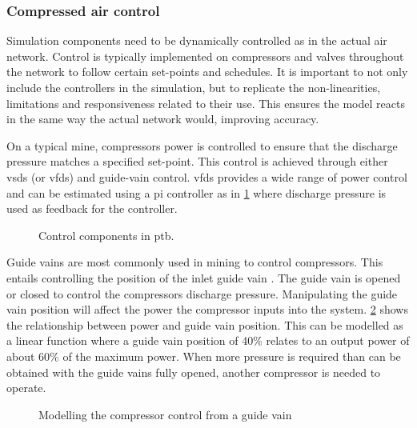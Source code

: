 		\subsubsection{Compressed air control}\label{Controllers}
			Simulation components need to be dynamically controlled as in the actual air network. Control is typically implemented on compressors and valves throughout the network to follow certain set-points and schedules. It is important to not only include the controllers in the simulation, but to replicate the non-linearities, limitations and responsiveness related to their use. This ensures the model reacts in the same way the actual network would, improving accuracy.
			\par 
			On a typical mine, compressors power is controlled to ensure that the discharge pressure matches a specified set-point. This control is achieved through either \glspl{vsd} (or \glspl{vfd}) and guide-vain control. \glspl{vfd} provides a wide range of power control and can be estimated using a \gls{pi} controller as in \cref{fig: Controller models} where discharge pressure is used as feedback for the controller. 
	\begin{figure}[h]
		\centering
		\caption[Control components in Process toolbox]{Control components in \gls{ptb}.}
		\label{fig: Controller models}
	\end{figure}
		Guide vains are most commonly used in mining to control compressors. This entails controlling the position of the inlet guide vain . The guide vain is opened or closed to control the compressors discharge pressure.  Manipulating the guide vain position will affect the power the compressor inputs into the system. \cref{fig: Guide vain position} shows the relationship between  power and guide vain position. This can be modelled as a linear function where a guide vain position of 40\% relates to an output power of about 60\% of the maximum power. When more pressure is required than can be obtained with the guide vains fully opened, another compressor is needed to operate. 
		\begin{figure}[h]
			\centering
			\fbox{}
			\caption{Modelling the compressor control from a guide vain}
			\label{fig: Guide vain position}
		\end{figure}
